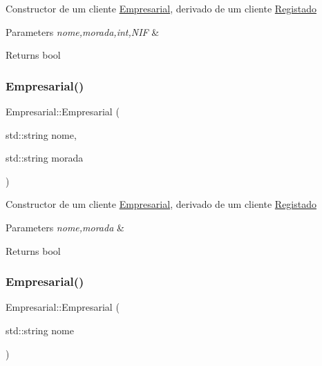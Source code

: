 Constructor de um cliente \hyperlink{class_empresarial}{Empresarial}, derivado de um cliente \hyperlink{class_registado}{Registado}


\begin{DoxyParams}{Parameters}
{\em nome,morada,int,N\+IF} & \\
\hline
\end{DoxyParams}
\begin{DoxyReturn}{Returns}
bool 
\end{DoxyReturn}
\hypertarget{class_empresarial_a8f89fe5f36da7bf48548ff67b27e547f}{}\label{class_empresarial_a8f89fe5f36da7bf48548ff67b27e547f} 
\subsubsection{\texorpdfstring{Empresarial()}{Empresarial()}\hspace{0.1cm}{\footnotesize\ttfamily [2/3]}}
{\footnotesize\ttfamily Empresarial\+::\+Empresarial (\begin{DoxyParamCaption}\item[{std\+::string}]{nome,  }\item[{std\+::string}]{morada }\end{DoxyParamCaption})}

Constructor de um cliente \hyperlink{class_empresarial}{Empresarial}, derivado de um cliente \hyperlink{class_registado}{Registado}


\begin{DoxyParams}{Parameters}
{\em nome,morada} & \\
\hline
\end{DoxyParams}
\begin{DoxyReturn}{Returns}
bool 
\end{DoxyReturn}
\hypertarget{class_empresarial_a1a87eb7f12020af2c8ee8e942f3b8344}{}\label{class_empresarial_a1a87eb7f12020af2c8ee8e942f3b8344} 
\subsubsection{\texorpdfstring{Empresarial()}{Empresarial()}\hspace{0.1cm}{\footnotesize\ttfamily [3/3]}}
{\footnotesize\ttfamily Empresarial\+::\+Empresarial (\begin{DoxyParamCaption}\item[{std\+::string}]{nome }\end{DoxyParamCaption})}

